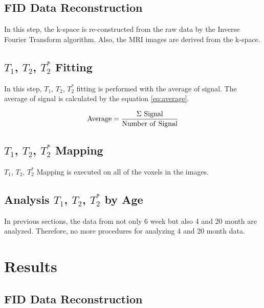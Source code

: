 \documentclass[10pt, a4paper]{article}
\begin{document}
			
	
		\subsection{FID Data Reconstruction}
			In this step, the k-space is re-constructed from the raw data by the Inverse Fourier Transform algorithm. Also, the MRI images are derived from the k-space. 
		
			
		
		\subsection{$T_1$, $T_2$, $T_2^*$ Fitting}
			In this step, $T_1$, $T_2$, $T_2^*$ fitting is performed with the average of signal. The average of signal is calculated by the equation \ref{eq:average}.
			
			\begin{equation}
				\rm{Average} = \frac{\Sigma \ Signal}{\rm{Number \ of \ Signal}}
				\label{eq:average}
			\end{equation}
		
			
		
		\subsection{$T_1$, $T_2$, $T_2^*$ Mapping}
			$T_1$, $T_2$, $T_2^*$ Mapping is executed on all of the voxels in the images. 
		
			
		
		\subsection{Analysis $T_1$, $T_2$, $T_2^*$  by Age}
			In previous sections, the data from not only 6 week but also 4 and 20 month are analyzed. Therefore, no more procedures for analyzing 4 and 20 month data. 
	
	\section{Results}
		\subsection{FID Data Reconstruction}
\end{document}
